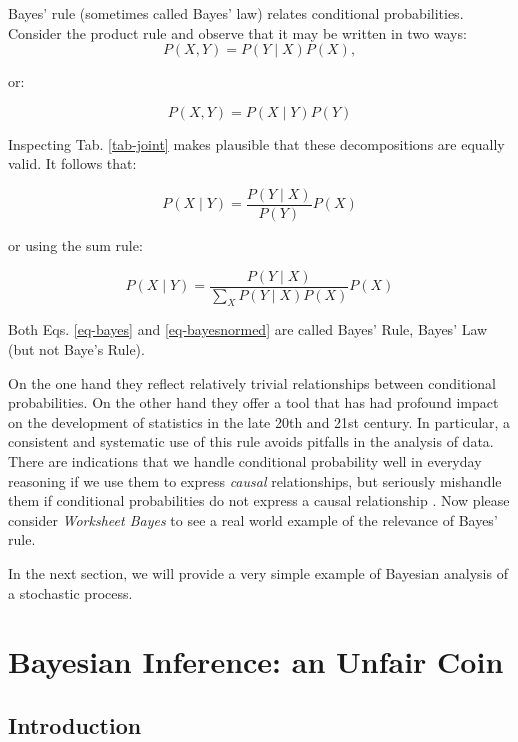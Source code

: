 Bayes' rule (sometimes called Bayes' law) relates conditional probabilities. Consider the product rule and observe that it may be written in two ways:
\begin{equation}
  P(X, Y) = P(Y  \mid X) P(X),
\end{equation}

or:

\begin{equation}
P(X, Y) = P(X \mid Y)P(Y)
\end{equation}

Inspecting Tab. \ref{tab-joint} makes plausible that these decompositions are equally valid.
It follows that:

\begin{equation}
P(X \mid Y) = \frac{P( Y \mid X)}{P(Y)}P(X)
\label{eq-bayes}
\end{equation}

or using the sum rule:

\begin{equation}
P(X \mid Y) = \frac{P (Y \mid X)}{\sum_X P(Y \mid X) P(X)} P(X)
\label{eq-bayesnormed}
\end{equation}

Both Eqs. \ref{eq-bayes} and \ref{eq-bayesnormed} are called Bayes' Rule, Bayes' Law (but not Baye's Rule).

On the one hand they reflect relatively trivial relationships between conditional probabilities. On the other hand they offer a tool that has had profound
impact on the development of statistics in the late 20th and 21st century. In particular, a consistent and systematic use of this rule avoids pitfalls in the analysis
of data. There are indications that we handle conditional probability well in everyday reasoning  if we use them to express \emph{causal} relationships,
but seriously mishandle them
if conditional probabilities do not express a causal relationship \cite{pearl2016,pearl2018}. Now please consider \emph{Worksheet Bayes} to see a real world example of the
relevance of Bayes' rule.

In the next section, we will provide a very simple example of Bayesian analysis of
a stochastic process.

\section{Bayesian Inference: an Unfair Coin}
\subsection{Introduction}

